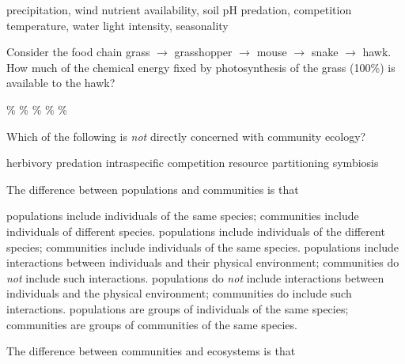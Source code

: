 \begin{choices}
\choice precipitation, wind%
\choice nutrient availability, soil pH%
\correctchoice predation, competition%
\choice temperature, water%
\choice light intensity, seasonality%
\end{choices}



\question
Consider the food chain grass $\to$ grasshopper $\to$ mouse $\to$ snake $\to$ hawk. How much of the chemical energy fixed by photosynthesis of the grass (100\%) is available to the hawk?

\begin{choices}
\%%
\%%
\%%
\%%
\%%
\end{choices}

\question
Which of the following is \emph{not} directly concerned with community ecology?

\begin{choices}
\choice herbivory%
\choice predation%
\correctchoice intraspecific competition%
\choice resource partitioning%
\choice symbiosis%
\end{choices}

\question
The difference between populations and communities is that

\begin{choices}
\correctchoice populations include individuals of the same species; communities include individuals of different species.%
\choice populations include individuals of the different species; communities include individuals of the same species.%
\hoice populations include interactions between individuals and their physical environment; communities do \emph{not} include such interactions.%
\choice populations do \emph{not} include interactions between individuals and the physical environment; communities do include such interactions.%
\choice populations are groups of individuals of the same species; communities are groups of communities of the same species.%
\end{choices}

\question
The difference between communities and ecosystems is that

